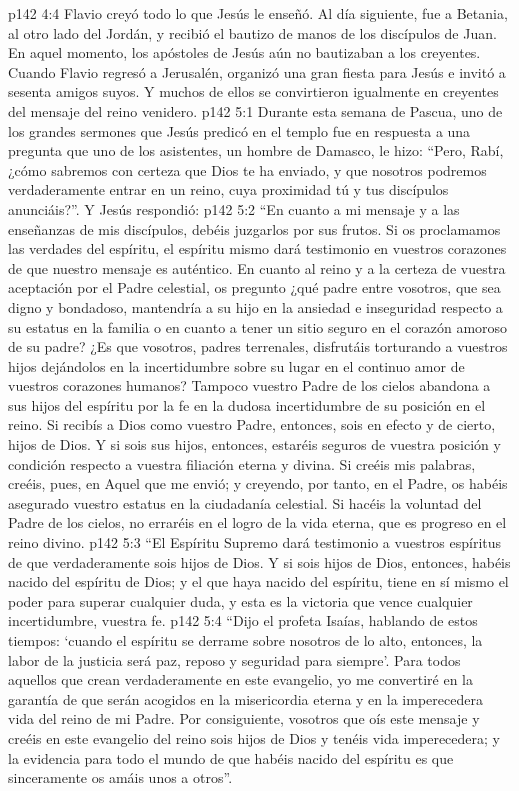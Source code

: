 \vs p142 4:4 \pc Flavio creyó todo lo que Jesús le enseñó. Al día siguiente, fue a Betania, al otro lado del Jordán, y recibió el bautizo de manos de los discípulos de Juan. En aquel momento, los apóstoles de Jesús aún no bautizaban a los creyentes. Cuando Flavio regresó a Jerusalén, organizó una gran fiesta para Jesús e invitó a sesenta amigos suyos. Y muchos de ellos se convirtieron igualmente en creyentes del mensaje del reino venidero.
\vs p142 5:1 Durante esta semana de Pascua, uno de los grandes sermones que Jesús predicó en el templo fue en respuesta a una pregunta que uno de los asistentes, un hombre de Damasco, le hizo: “Pero, Rabí, ¿cómo sabremos con certeza que Dios te ha enviado, y que nosotros podremos verdaderamente entrar en un reino, cuya proximidad tú y tus discípulos anunciáis?”. Y Jesús respondió:
\vs p142 5:2 \pc “En cuanto a mi mensaje y a las enseñanzas de mis discípulos, debéis juzgarlos por sus frutos. Si os proclamamos las verdades del espíritu, el espíritu mismo dará testimonio en vuestros corazones de que nuestro mensaje es auténtico. En cuanto al reino y a la certeza de vuestra aceptación por el Padre celestial, os pregunto ¿qué padre entre vosotros, que sea digno y bondadoso, mantendría a su hijo en la ansiedad e inseguridad respecto a su estatus en la familia o en cuanto a tener un sitio seguro en el corazón amoroso de su padre? ¿Es que vosotros, padres terrenales, disfrutáis torturando a vuestros hijos dejándolos en la incertidumbre sobre su lugar en el continuo amor de vuestros corazones humanos? Tampoco vuestro Padre de los cielos abandona a sus hijos del espíritu por la fe en la dudosa incertidumbre de su posición en el reino. Si recibís a Dios como vuestro Padre, entonces, sois en efecto y de cierto, hijos de Dios. Y si sois sus hijos, entonces, estaréis seguros de vuestra posición y condición respecto a vuestra filiación eterna y divina. Si creéis mis palabras, creéis, pues, en Aquel que me envió; y creyendo, por tanto, en el Padre, os habéis asegurado vuestro estatus en la ciudadanía celestial. Si hacéis la voluntad del Padre de los cielos, no erraréis en el logro de la vida eterna, que es progreso en el reino divino.
\vs p142 5:3 “El Espíritu Supremo dará testimonio a vuestros espíritus de que verdaderamente sois hijos de Dios. Y si sois hijos de Dios, entonces, habéis nacido del espíritu de Dios; y el que haya nacido del espíritu, tiene en sí mismo el poder para superar cualquier duda, y esta es la victoria que vence cualquier incertidumbre, vuestra fe.
\vs p142 5:4 “Dijo el profeta Isaías, hablando de estos tiempos: ‘cuando el espíritu se derrame sobre nosotros de lo alto, entonces, la labor de la justicia será paz, reposo y seguridad para siempre’. Para todos aquellos que crean verdaderamente en este evangelio, yo me convertiré en la garantía de que serán acogidos en la misericordia eterna y en la imperecedera vida del reino de mi Padre. Por consiguiente, vosotros que oís este mensaje y creéis en este evangelio del reino sois hijos de Dios y tenéis vida imperecedera; y la evidencia para todo el mundo de que habéis nacido del espíritu es que sinceramente os amáis unos a otros”.
